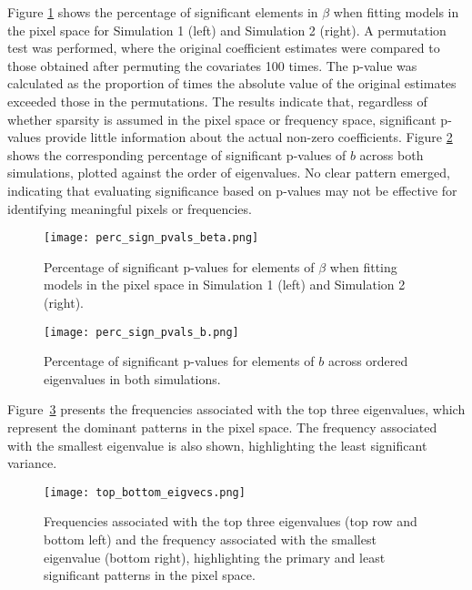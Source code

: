 \documentclass[12pt]{article}
\begin{document}
Figure \ref{fig:perc_sign_beta} shows the percentage of significant elements in \( \beta \) when fitting models in the
pixel space for Simulation 1 (left) and Simulation 2 (right). A permutation test was performed, where the original
coefficient estimates were compared to those obtained after permuting the covariates 100 times. The p-value was
calculated as the proportion of times the absolute value of the original estimates exceeded those in the permutations.
The results indicate that, regardless of whether sparsity is assumed in the pixel space or frequency space, significant
p-values provide little information about the actual non-zero coefficients. Figure \ref{fig:perc_sign_b} shows the corresponding percentage of significant p-values of \( b \) across both
simulations, plotted against the order of eigenvalues. No clear pattern emerged, indicating that evaluating significance
based on p-values may not be effective for identifying meaningful pixels or frequencies.

\begin{figure}[htbp] 
	\centering
  \texttt{[image: perc\_sign\_pvals\_beta.png]} 
  \caption{Percentage of significant p-values for elements of \( \beta \) when fitting models in the pixel space in
  Simulation 1 (left) and Simulation 2 (right).}
	\label{fig:perc_sign_beta} 
\end{figure}

\begin{figure}[htbp] 
	\centering
  \texttt{[image: perc\_sign\_pvals\_b.png]} 
  \caption{Percentage of significant p-values for elements of \( b \) across ordered eigenvalues in both simulations.}
	\label{fig:perc_sign_b} 
\end{figure}

Figure~\ref*{fig:top_bottom_eigvecs} presents the frequencies associated with the top three eigenvalues, which represent
the dominant patterns in the pixel space. The frequency associated with the smallest eigenvalue is also shown,
highlighting the least significant variance.

\begin{figure}[htbp] 
	\centering
	\texttt{[image: top\_bottom\_eigvecs.png]} 
\caption{Frequencies associated with the top three eigenvalues (top row and
bottom left) and the frequency associated with the smallest eigenvalue (bottom
right), highlighting the primary and least significant patterns in the pixel
space.}
	\label{fig:top_bottom_eigvecs} 
\end{figure}
\end{document}
